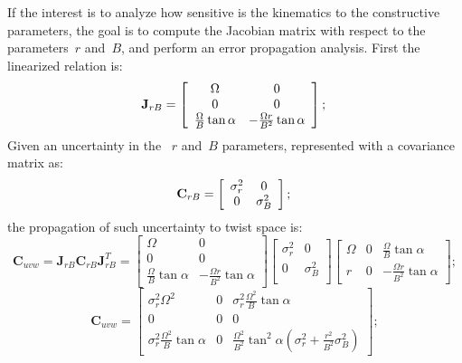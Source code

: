 If the interest is to analyze how sensitive is the kinematics to the constructive parameters, the goal is to compute the Jacobian matrix with respect to the parameters~$r$ and~$B$, and perform an error propagation analysis. First the linearized relation is: 
\begin{equation}
\mathbf{J}_{r B} = 
\left[
 \begin{array}{cc}
  \Omega & 0  \\
  0 & 0  \\
  \frac{\Omega}{B}\tan \alpha & -\frac{\Omega r}{B^2}\tan \alpha
 \end{array}
 \right]; \\ 
\end{equation}
Given an uncertainty in the ~$r$ and~$B$ parameters, represented with a covariance matrix as:
\begin{equation}
\mathbf{C}_{r B} = 
\left[
 \begin{array}{cc}
  \sigma^2_r & 0  \\
  0 & \sigma^2_B  \\
 \end{array}
 \right]; \\ 
\end{equation}
the propagation of such uncertainty to twist space is: 
\begin{equation}
\mathbf{C}_{uvw} = \mathbf{J}_{r B} \mathbf{C}_{r B} \mathbf{J}_{r B}^T = 
 \left[
 \begin{array}{cc}
  \Omega & 0  \\
  0 & 0  \\
  \frac{\Omega}{B}\tan \alpha & -\frac{\Omega r}{B^2}\tan \alpha
 \end{array}
 \right]
 \left[
 \begin{array}{cc}
  \sigma^2_r & 0  \\
  0 & \sigma^2_B  \\
 \end{array}
 \right]
 \left[
 \begin{array}{ccc}
  \Omega & 0 & \frac{\Omega}{B}\tan \alpha\\
  r & 0 & -\frac{\Omega r}{B^2}\tan \alpha
 \end{array}
 \right];
\end{equation}
\begin{equation}
\mathbf{C}_{uvw} = 
 \left[
 \begin{array}{ccc}
  \sigma^2_r \Omega^2 & 0 & \sigma^2_r \frac{\Omega^2}{B}\tan \alpha\\
  0 & 0 & 0\\
  \sigma^2_r \frac{\Omega^2}{B}\tan \alpha & 0 & \frac{\Omega^2}{B^2}\tan^2 \alpha (\sigma^2_r+\frac{r^2}{B^2} \sigma^2_B )
 \end{array}
 \right];
\end{equation}
